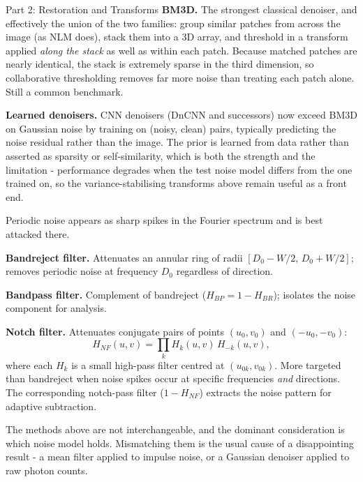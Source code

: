 \documentclass[letterpaper]{article}
\begin{document}
\begin{notes}{Part 2: Restoration and Transforms}
\textbf{BM3D.} The strongest classical denoiser, and effectively the union of the two families: group similar patches from across the image (as NLM does), stack them into a 3D array, and threshold in a transform applied \emph{along the stack} as well as within each patch. Because matched patches are nearly identical, the stack is extremely sparse in the third dimension, so collaborative thresholding removes far more noise than treating each patch alone. Still a common benchmark.

\textbf{Learned denoisers.} CNN denoisers (DnCNN and successors) now exceed BM3D on Gaussian noise by training on (noisy, clean) pairs, typically predicting the noise residual rather than the image. The prior is learned from data rather than asserted as sparsity or self-similarity, which is both the strength and the limitation - performance degrades when the test noise model differs from the one trained on, so the variance-stabilising transforms above remain useful as a front end.


Periodic noise appears as sharp spikes in the Fourier spectrum and is best attacked there.

\textbf{Bandreject filter.} Attenuates an annular ring of radii $[D_0-W/2,\,D_0+W/2]$; removes periodic noise at frequency $D_0$ regardless of direction.

\textbf{Bandpass filter.} Complement of bandreject ($H_{BP}=1-H_{BR}$); isolates the noise component for analysis.

\textbf{Notch filter.} Attenuates conjugate pairs of points $(u_0,v_0)$ and $(-u_0,-v_0)$:
$$H_{NF}(u,v) = \prod_k H_k(u,v)\,H_{-k}(u,v),$$
where each $H_k$ is a small high-pass filter centred at $(u_{0k},v_{0k})$. More targeted than bandreject when noise spikes occur at specific frequencies \emph{and} directions. The corresponding notch-pass filter ($1-H_{NF}$) extracts the noise pattern for adaptive subtraction.


The methods above are not interchangeable, and the dominant consideration is which noise model holds. Mismatching them is the usual cause of a disappointing result - a mean filter applied to impulse noise, or a Gaussian denoiser applied to raw photon counts.


\end{notes}
\end{document}
